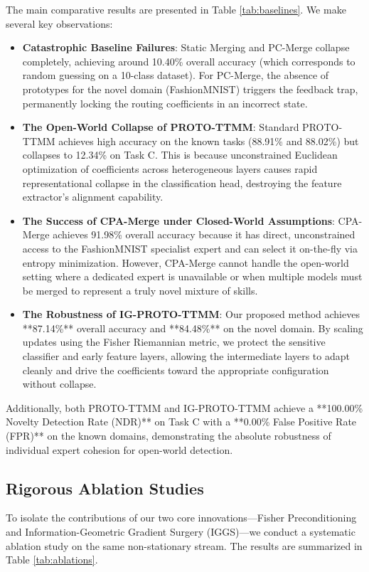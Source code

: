 \documentclass{article}
\theoremstyle{plain}
\theoremstyle{definition}
\theoremstyle{remark}
\begin{document}
The main comparative results are presented in Table \ref{tab:baselines}. We make several key observations:
\begin{itemize}
  \item \textbf{Catastrophic Baseline Failures}: Static Merging and PC-Merge collapse completely, achieving around 10.40\% overall accuracy (which corresponds to random guessing on a 10-class dataset). For PC-Merge, the absence of prototypes for the novel domain (FashionMNIST) triggers the feedback trap, permanently locking the routing coefficients in an incorrect state.
  \item \textbf{The Open-World Collapse of PROTO-TTMM}: Standard PROTO-TTMM achieves high accuracy on the known tasks (88.91\% and 88.02\%) but collapses to 12.34\% on Task C. This is because unconstrained Euclidean optimization of coefficients across heterogeneous layers causes rapid representational collapse in the classification head, destroying the feature extractor's alignment capability.
  \item \textbf{The Success of CPA-Merge under Closed-World Assumptions}: CPA-Merge achieves 91.98\% overall accuracy because it has direct, unconstrained access to the FashionMNIST specialist expert and can select it on-the-fly via entropy minimization. However, CPA-Merge cannot handle the open-world setting where a dedicated expert is unavailable or when multiple models must be merged to represent a truly novel mixture of skills.
  \item \textbf{The Robustness of IG-PROTO-TTMM}: Our proposed method achieves **87.14\%** overall accuracy and **84.48\%** on the novel domain. By scaling updates using the Fisher Riemannian metric, we protect the sensitive classifier and early feature layers, allowing the intermediate layers to adapt cleanly and drive the coefficients toward the appropriate configuration without collapse.
\end{itemize}

Additionally, both PROTO-TTMM and IG-PROTO-TTMM achieve a **100.00\% Novelty Detection Rate (NDR)** on Task C with a **0.00\% False Positive Rate (FPR)** on the known domains, demonstrating the absolute robustness of individual expert cohesion for open-world detection.

\subsection{Rigorous Ablation Studies}

To isolate the contributions of our two core innovations—Fisher Preconditioning and Information-Geometric Gradient Surgery (IGGS)—we conduct a systematic ablation study on the same non-stationary stream. The results are summarized in Table \ref{tab:ablations}.
\end{document}
